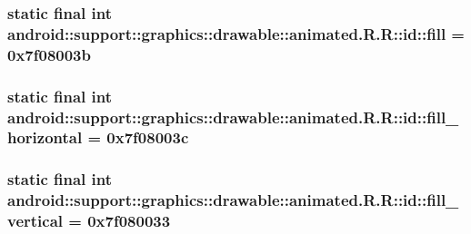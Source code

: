 \hypertarget{classandroid_1_1support_1_1graphics_1_1drawable_1_1animated_1_1_r_1_1id_6847e1f2cfd1746170241ddfb8da28a4}{
\subsubsection[{fill}]{\setlength{\rightskip}{0pt plus 5cm}static final int android::support::graphics::drawable::animated.R.R::id::fill = 0x7f08003b}}
\label{classandroid_1_1support_1_1graphics_1_1drawable_1_1animated_1_1_r_1_1id_6847e1f2cfd1746170241ddfb8da28a4}


\hypertarget{classandroid_1_1support_1_1graphics_1_1drawable_1_1animated_1_1_r_1_1id_6279ea825cd9fe4256e016ce0062c835}{
\subsubsection[{fill\_\-horizontal}]{\setlength{\rightskip}{0pt plus 5cm}static final int android::support::graphics::drawable::animated.R.R::id::fill\_\-horizontal = 0x7f08003c}}
\label{classandroid_1_1support_1_1graphics_1_1drawable_1_1animated_1_1_r_1_1id_6279ea825cd9fe4256e016ce0062c835}


\hypertarget{classandroid_1_1support_1_1graphics_1_1drawable_1_1animated_1_1_r_1_1id_2ed83e7395cb8537b798ff99f3f0fa15}{
\subsubsection[{fill\_\-vertical}]{\setlength{\rightskip}{0pt plus 5cm}static final int android::support::graphics::drawable::animated.R.R::id::fill\_\-vertical = 0x7f080033}}
\label{classandroid_1_1support_1_1graphics_1_1drawable_1_1animated_1_1_r_1_1id_2ed83e7395cb8537b798ff99f3f0fa15}



